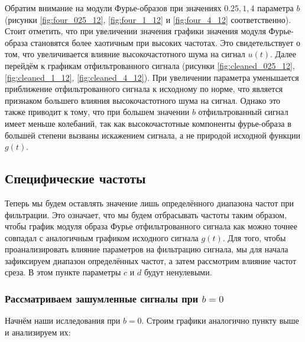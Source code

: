 Обратим внимание на модули Фурье-образов при значениях $0.25, 1, 4$ параметра $b$ (рисунки \ref{fig:four_025_12}, \ref{fig:four_1_12} и \ref{fig:four_4_12} соответственно). Стоит отметить, что при увеличении значения графики значения модуля Фурье-образа становятся более хаотичным при высоких частотах. Это свидетельствует о том, что увеличивается влияние высокочастотного шума на сигнал $u(t)$. Далее перейдём к графикам отфильтрованного сигнала (рисунки \ref{fig:cleaned_025_12}, \ref{fig:cleaned_1_12}, \ref{fig:cleaned_4_12}). При увеличении параметра уменьшается приближение отфильтрованного сигнала к исходному по норме, что является признаком большего влияния высокочастотного шума на сигнал. Однако это также приводит к тому, что при большем значении $b$ отфильтрованный сигнал имеет меньше колебаний, так как высокочастотные компоненты фурье-образа в большей степени вызваны искажением сигнала, а не природой исходной функции $g(t)$. 

\clearpage
\subsection{Специфические частоты}

Теперь мы будем оставлять значение лишь определённого диапазона частот при фильтрации. Это означает, что мы будем отбрасывать частоты таким образом, чтобы график модуля образа Фурье отфильтрованного сигнала как можно точнее совпадал с аналогичным графиком исходного сигнала $g(t)$. Для того, чтобы проанализировать влияние параметров на фильтрацию сигнала, мы для начала зафиксируем диапазон определённых частот, а затем рассмотрим влияние частот среза. В этом пункте параметры $c$ и $d$ будут ненулевыми.

\subsubsection{Рассматриваем зашумленные сигналы при $b=0$}\label{b_0}

Начнём наши ислледования при $b=0$. Строим графики аналогично пункту выше и анализируем их:

